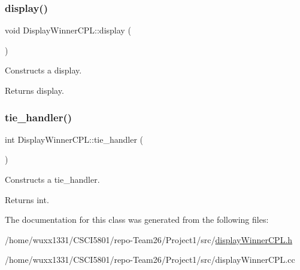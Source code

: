 \subsubsection{\texorpdfstring{display()}{display()}}
{\footnotesize\ttfamily void Display\+Winner\+C\+P\+L\+::display (\begin{DoxyParamCaption}{ }\end{DoxyParamCaption})}



Constructs a display. 

\begin{DoxyReturn}{Returns}
display. 
\end{DoxyReturn}
\mbox{\label{classDisplayWinnerCPL_a967c2bc90c53caf7788726e74d31d7ba}} 
\subsubsection{\texorpdfstring{tie\+\_\+handler()}{tie\_handler()}}
{\footnotesize\ttfamily int Display\+Winner\+C\+P\+L\+::tie\+\_\+handler (\begin{DoxyParamCaption}{ }\end{DoxyParamCaption})}



Constructs a tie\+\_\+handler. 

\begin{DoxyReturn}{Returns}
int. 
\end{DoxyReturn}


The documentation for this class was generated from the following files\+:\begin{DoxyCompactItemize}
\item 
/home/wuxx1331/\+C\+S\+C\+I5801/repo-\/\+Team26/\+Project1/src/\hyperlink{displayWinnerCPL_8h}{display\+Winner\+C\+P\+L.\+h}\item 
/home/wuxx1331/\+C\+S\+C\+I5801/repo-\/\+Team26/\+Project1/src/display\+Winner\+C\+P\+L.\+cc\end{DoxyCompactItemize}
